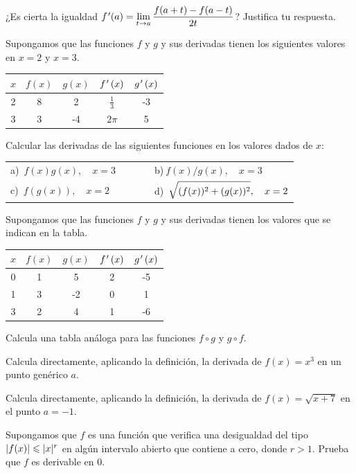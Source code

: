 \begin{ejercicios propuestos}
\propuesto ¿Es cierta la igualdad ${\displaystyle f\mbox{$^{\mspace{2mu}\prime}$}(a)=\lim_{t\to a}\dfrac{f(a+t)-f(a-t)}{2t}}$?
Justifica tu respuesta.

\propuesto Supongamos que las funciones $f$ y $g$ y sus derivadas
tienen los siguientes valores en $x=2$ y $x=3$.
\begin{center}
\begin{tabular}{|c|c|c||c|c|}
\hline 
$x$ &
$f\left(x\right)$ &
$g\left(x\right)$ &
$f\mbox{$^{\mspace{2mu}\prime}$}\left(x\right)$ &
$g\mbox{$^{\mspace{2mu}\prime}$}\left(x\right)$\tabularnewline
\hline 
\hline 
2 &
8 &
2 &
$\frac{1}{3}$ &
-3\tabularnewline
\hline 
3 &
3 &
-4 &
$2\pi$ &
5\tabularnewline
\hline 
\end{tabular}
\par\end{center}

Calcular las derivadas de las siguientes funciones en los valores
dados de $x$:

\begin{tabular}{ll}
a)\ $f(x)g(x),\quad x=3\qquad\quad$  &
b)$\ f(x)/g(x),\quad x=3$\tabularnewline
c)\ $f(g(x)),\quad x=2$  &
d)\ $\sqrt{\rule{0mm}{3.5mm}(f(x))^{2}+(g(x))^{2}},\quad x=2$ \tabularnewline
\end{tabular}

\propuesto Supongamos que las funciones $f$ y $g$ y sus derivadas
tienen los valores que se indican en la tabla.
\begin{center}
\begin{tabular}{|c|c|c|c|c|}
\hline 
$x$ &
$f\left(x\right)$ &
$g\left(x\right)$ &
$f\mbox{$^{\mspace{2mu}\prime}$}\left(x\right)$ &
$g\mbox{$^{\mspace{2mu}\prime}$}\left(x\right)$\tabularnewline
\hline 
\hline 
0 &
1 &
5 &
2 &
-5\tabularnewline
\hline 
1 &
3 &
-2 &
0 &
1\tabularnewline
\hline 
3 &
2 &
4 &
1 &
-6\tabularnewline
\hline 
\end{tabular}
\par\end{center}

Calcula una tabla análoga para las funciones $f\circ g$ y $g\circ f$.

\propuesto Calcula directamente, aplicando la definición, la derivada
de $f(x)=x^{3}$ en un punto genérico $a$.

\propuesto Calcula directamente, aplicando la definición, la derivada
de $f(x)=\sqrt{x+7}$ en el punto $a=-1$.

\propuesto Supongamos que $f$ es una función que verifica una desigualdad
del tipo $\lvert{f(x)}\rvert\leqslant\lvert{x}\rvert^{r}$ en algún intervalo abierto que
contiene a cero, donde $r>1$. Prueba que $f$ es derivable en $0$.


\end{ejercicios propuestos}
